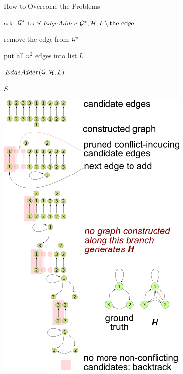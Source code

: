 \documentclass[final,hyperref={pdfpagelabels=false}]{beamer}
\begin{document}
\begin{frame}{}
\begin{columns}[t]
\begin{column}{.48\linewidth}
\begin{block}{\Large How to Overcome the Problems}
\begin{minipage}{0.5\textwidth}
{{{{{                    
                    { 
                      add ${\cal G}^*$ to $S$
                    }
                    $EdgeAdder$ ${\cal G}^*, {\cal H},
                    L\setminus\text{the edge}$

                    remove the edge from ${\cal G}^*$
                  }
                }
                
              }
            }

            \BlankLine
            put all $n^2$ edges into list $L$

            $EdgeAdder({\cal G},{\cal H}, L)$

            \Return $S$
          }
        \end{minipage} %
        \begin{minipage}{0.4\textwidth}
          \centerline{\includegraphics[scale = 1.8]{recursive_tree}}
        \end{minipage}




\end{block}
\end{column}
\end{columns}
\end{frame}
\end{document}
